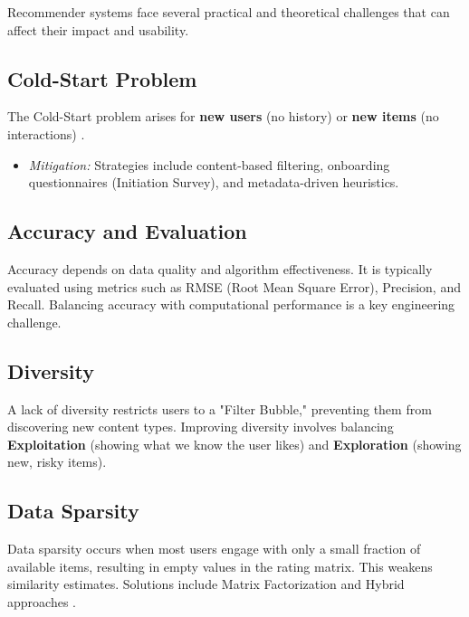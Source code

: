 Recommender systems face several practical and theoretical challenges that can affect their impact and usability.



\subsection{Cold-Start Problem}

The Cold-Start problem arises for \textbf{new users} (no history) or \textbf{new items} (no interactions) \cite{ref:cold_start}. 

\begin{itemize}

    \item \textit{Mitigation:} Strategies include content-based filtering, onboarding questionnaires (Initiation Survey), and metadata-driven heuristics.

\end{itemize}



\subsection{Accuracy and Evaluation}

Accuracy depends on data quality and algorithm effectiveness. It is typically evaluated using metrics such as RMSE (Root Mean Square Error), Precision, and Recall. Balancing accuracy with computational performance is a key engineering challenge.



\subsection{Diversity}

A lack of diversity restricts users to a "Filter Bubble," preventing them from discovering new content types. Improving diversity involves balancing \textbf{Exploitation} (showing what we know the user likes) and \textbf{Exploration} (showing new, risky items).



\subsection{Data Sparsity}

Data sparsity occurs when most users engage with only a small fraction of available items, resulting in empty values in the rating matrix. This weakens similarity estimates. Solutions include Matrix Factorization and Hybrid approaches \cite{ref:matrix_factorization}.



